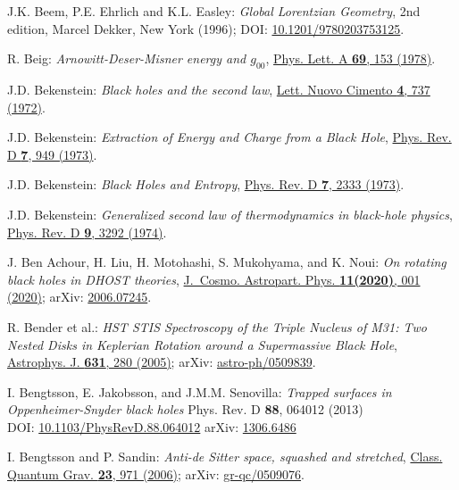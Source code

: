 \begin{thebibliography}{123}
J.K. Beem, P.E. Ehrlich and K.L. Easley:
{\em Global Lorentzian Geometry}, 2nd edition,
Marcel Dekker, New York (1996);
DOI: \href{https://doi.org/10.1201/9780203753125}{10.1201/9780203753125}.

R. Beig:
{\em Arnowitt-Deser-Misner energy and $g_{00}$},
\href{https://doi.org/10.1016/0375-9601(78)90198-6}{Phys. Lett. A {\bf 69}, 153 (1978)}.

J.D. Bekenstein:
{\em Black holes and the second law},
\href{https://doi.org/10.1007/BF02757029}{Lett. Nuovo Cimento {\bf 4}, 737 (1972)}.

J.D. Bekenstein:
{\em Extraction of Energy and Charge from a Black Hole},
\href{https://doi.org/10.1103/PhysRevD.7.949}{Phys. Rev. D {\bf 7}, 949 (1973)}.

J.D. Bekenstein:
{\em Black Holes and Entropy},
\href{https://doi.org/10.1103/PhysRevD.7.2333}{Phys. Rev. D {\bf 7}, 2333 (1973)}.

J.D. Bekenstein:
{\em Generalized second law of thermodynamics in black-hole physics},
\href{https://doi.org/10.1103/PhysRevD.9.3292}{Phys. Rev. D {\bf 9}, 3292 (1974)}.

J. Ben Achour, H. Liu, H. Motohashi, S. Mukohyama, and K. Noui:
{\em On rotating black holes in DHOST theories},
\href{https://doi.org/10.1088/1475-7516/2020/11/001}{J.~Cosmo. Astropart. Phys. {\bf 11(2020)}, 001 (2020)};
arXiv: \href{https://arxiv.org/abs/2006.07245}{2006.07245}.

R. Bender et al.:
{\em HST STIS Spectroscopy of the Triple Nucleus of M31: Two Nested Disks in Keplerian Rotation around a Supermassive Black Hole},
\href{https://doi.org/10.1086/432434}{Astrophys. J. {\bf 631}, 280 (2005)};
arXiv: \href{https://arxiv.org/abs/astro-ph/0509839}{astro-ph/0509839}.

I. Bengtsson, E. Jakobsson, and J.M.M. Senovilla:
{\em Trapped surfaces in Oppenheimer-Snyder black holes}
Phys. Rev. D {\bf 88}, 064012 (2013)\\
DOI: \href{https://doi.org/10.1103/PhysRevD.88.064012}{10.1103/PhysRevD.88.064012}\hfill
arXiv: \href{https://arxiv.org/abs/1306.6486}{1306.6486}

I. Bengtsson and P. Sandin:
{\em Anti-de Sitter space, squashed and stretched},
\href{https://doi.org/10.1088/0264-9381/23/3/022}{Class. Quantum Grav. {\bf 23}, 971 (2006)};
arXiv: \href{https://arxiv.org/abs/gr-qc/0509076}{gr-qc/0509076}.


\end{thebibliography}
